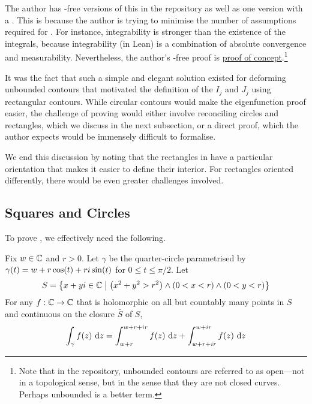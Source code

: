The author has \sorry-free versions of this in the repository as well as one version with a \sorry. This is because the author is trying to minimise the number of assumptions required for . For instance, integrability is stronger than the existence of the integrals, because integrability (in Lean) is a combination of absolute convergence and measurability. Nevertheless, the author's \sorry-free proof is \href{https://github.com/thefundamentaltheor3m/Sphere-Packing-Lean/blob/704c085b1251cc0c208cc373f4e6105af359edd4/SpherePacking/ForMathlib/CauchyGoursat/OpenRectangular.lean#L162}{proof of concept}.\footnote{Note that in the repository, unbounded contours are referred to as open---not in a topological sense, but in the sense that they are not closed curves. Perhaps unbounded is a better term.}

It was the fact that such a simple and elegant solution existed for deforming unbounded contours that motivated the definition of the $I_j$ and $J_j$ using rectangular contours. While circular contours would make the eigenfunction proof easier, the challenge of proving  would either involve reconciling circles and rectangles, which we discuss in the next subsection, or a direct proof, which the author expects would be immensely difficult to formalise.

We end this discussion by noting that the rectangles in  have a particular orientation that makes it easier to define their interior. For rectangles oriented differently, there would be even greater challenges involved.

\subsection{Squares and Circles}

To prove , we effectively need the following.

\begin{boxtheorem}\label{Ch5:Thm:CauchyGoursat_Circle_Rectangle}
    Fix $w \in \mathbb{C}$ and $r > 0$. Let $\gamma$ be the quarter-circle parametrised by $\gamma(t) = w + r\cos\!{\left( t \right)} + r i \sin\!{\left( t \right)}$ for $0 \leq t \leq \pi/2$. Let
    \begin{align*}
        S = \left\{ x + yi \in \mathbb{C} \; \middle\vert \; \left( x^2 + y^2 > r^2 \right) \land \left( 0 < x < r \right) \land \left( 0 < y < r \right) \right\}
    \end{align*}
    For any $f : \mathbb{C} \to \mathbb{C}$ that is holomorphic on all but countably many points in $S$ and continuous on the closure $\bar{S}$ of $S$,
    \begin{align*}
        \int_{\gamma} f(z) \, \operatorname{d}\!{z}
        = \int_{w + r}^{w + r + ir} f(z) \, \operatorname{d}\!{z} + \int_{w + r + ir}^{w + ir} f(z) \, \operatorname{d}\!{z}
    \end{align*}
\end{boxtheorem}

